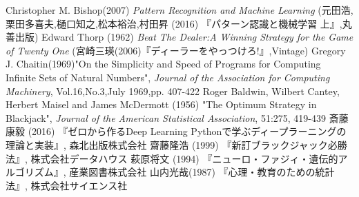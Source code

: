 \begin{thebibliography}{9}
   Christopher M. Bishop(2007) {\it{Pattern Recognition and Machine Learning}} (元田浩,栗田多喜夫,樋口知之,松本裕治,村田昇 (2016) 『パターン認識と機械学習 上』,丸善出版)
   Edward Thorp (1962) {\it{Beat The Dealer:A Winning Strategy for the Game of Twenty One}} (宮崎三瑛(2006)『ディーラーをやっつけろ!』,Vintage)
   Gregory J. Chaitin(1969)"On the Simplicity and Speed of Programs for Computing Infinite Sets of Natural Numbers", {\it{Journal of the Association for Computing Machinery}}, Vol.16,No.3,July 1969,pp. 407-422
   Roger Baldwin, Wilbert Cantey, Herbert Maisel and James McDermott (1956) "The Optimum Strategy in Blackjack", {\it{Journal of the American Statistical Association}}, 51:275, 419-439
   斎藤康毅 (2016) 『ゼロから作るDeep Learning Pythonで学ぶディープラーニングの理論と実装』, 森北出版株式会社
   齋藤隆浩 (1999) 『新訂ブラックジャック必勝法』, 株式会社データハウス
   萩原将文 (1994) 『ニューロ・ファジィ・遺伝的アルゴリズム』, 産業図書株式会社
   山内光哉(1987) 『心理・教育のための統計法』, 株式会社サイエンス社
\end{thebibliography}
